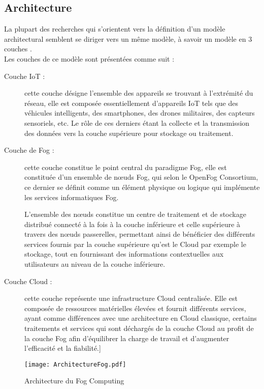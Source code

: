 \subsection{Architecture}
La plupart des recherches qui s'orientent vers la définition d'un modèle architectural semblent se diriger vers un même modèle, à savoir un modèle en 3 couches \cite{de2019}.\\
Les couches de ce modèle sont présentées comme suit :
\begin{description}
  \item[Couche IoT :] cette couche désigne l'ensemble des appareils se trouvant à l'extrémité du réseau, elle est composée essentiellement d'appareils IoT tels que des véhicules intelligents, des smartphones, des drones militaires, des capteurs sensoriels, etc. Le rôle de ces derniers étant la collecte et la transmission des données vers la couche supérieure pour stockage ou traitement.
  \item[Couche de Fog :] cette couche constitue le point central du paradigme Fog, elle est constituée d'un ensemble de nœuds Fog, qui selon le OpenFog Consortium, ce dernier se définit comme 
  \og{}un élément physique ou logique qui implémente les services informatiques Fog\fg\cite{de2019}.\par
  L'ensemble des nœuds constitue un centre de traitement et de stockage distribué connecté à la fois à la couche inférieure et celle supérieure à travers des nœuds passerelles, permettant ainsi de bénéficier des différents services fournis par la couche supérieure qu'est le Cloud par exemple le stockage, tout en fournissant des informations contextuelles aux utilisateurs au niveau de la couche inférieure.
  \item[Couche Cloud :] cette couche représente une infrastructure Cloud centralisée. Elle est composée de ressources matérielles élevées et fournit différents services, ayant comme différences avec une architecture en Cloud classique, certains traitements et services qui sont déchargés de la couche Cloud au profit de la couche Fog afin d'équilibrer la charge de travail et d'augmenter l'efficacité et la fiabilité.] 
\end{description}

\begin{figure}[H]
  \centering
  \texttt{[image: ArchitectureFog.pdf]}
  \caption{Architecture du Fog Computing}
  \label{fig:architectureFog}
\end{figure}

